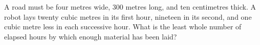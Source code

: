 A road must be four metres wide, 300 metres long, and ten centimetres thick. A robot lays twenty cubic metres in its first hour, nineteen in its second, and one cubic metre less in each successive hour. What is the least whole number of elapsed hours by which enough material has been laid?
